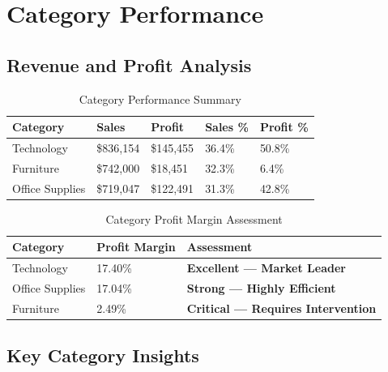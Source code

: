 \documentclass[11pt,a4paper]{article}
\begin{document}
\section{Category Performance}

\subsection{Revenue and Profit Analysis}

\begin{table}[H]
\centering
\begin{tabular}{@{}p{3cm} p{2.5cm} p{2.5cm} p{2cm} p{2cm}@{}}
\toprule
\rowcolor{primary!10}
\textbf{Category} & \textbf{Sales} & \textbf{Profit} & \textbf{Sales \%} & \textbf{Profit \%} \\
\midrule
\rowcolor{accent!5}
Technology & \$836,154 & \textcolor{profitgreen}{\$145,455} & 36.4\% & 50.8\% \\
Furniture & \$742,000 & \textcolor{warningred}{\$18,451} & 32.3\% & 6.4\% \\
\rowcolor{lightgray}
Office Supplies & \$719,047 & \textcolor{profitgreen}{\$122,491} & 31.3\% & 42.8\% \\
\bottomrule
\end{tabular}
\caption{Category Performance Summary}
\end{table}

\begin{table}[H]
\centering
\begin{tabular}{@{}p{3cm} p{2.5cm} p{2.5cm}@{}}
\toprule
\rowcolor{primary!10}
\textbf{Category} & \textbf{Profit Margin} & \textbf{Assessment} \\
\midrule
\rowcolor{accent!5}
Technology & 17.40\% & \textcolor{profitgreen}{\textbf{Excellent — Market Leader}} \\
\rowcolor{lightgray}
Office Supplies & 17.04\% & \textcolor{profitgreen}{\textbf{Strong — Highly Efficient}} \\
Furniture & 2.49\% & \textcolor{warningred}{\textbf{Critical — Requires Intervention}} \\
\bottomrule
\end{tabular}
\caption{Category Profit Margin Assessment}
\end{table}

\subsection{Key Category Insights}
\end{document}
